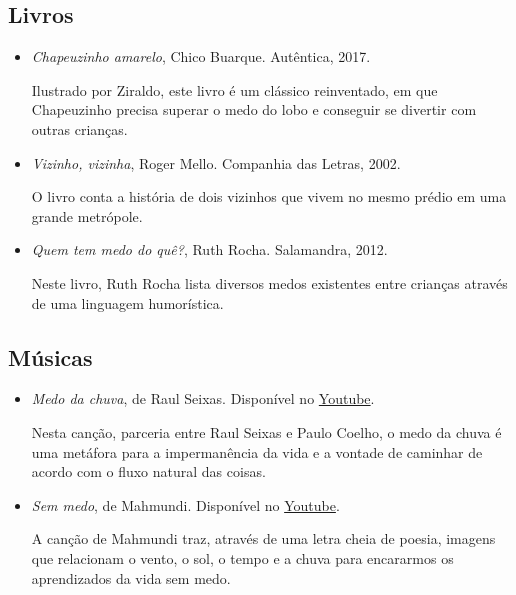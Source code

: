 \documentclass[11pt]{extarticle}
\begin{document}
\subsection{Livros}

\begin{itemize}

\item \textit{Chapeuzinho amarelo}, Chico Buarque. Autêntica, 2017.

Ilustrado por Ziraldo, este livro é um clássico reinventado, em que Chapeuzinho precisa superar o medo do lobo e conseguir se divertir com outras crianças.

\item \textit{Vizinho, vizinha}, Roger Mello. Companhia das Letras, 2002.

O livro conta a história de dois vizinhos que vivem no mesmo prédio em uma grande metrópole.

\item \textit{Quem tem medo do quê?}, Ruth Rocha. Salamandra, 2012.

Neste livro, Ruth Rocha lista diversos medos existentes entre crianças através de uma linguagem humorística.

\end{itemize}

\subsection{Músicas}

\begin{itemize}

\item \textit{Medo da chuva}, de Raul Seixas. Disponível no \href{https://www.youtube.com/watch?v=SQAozIai-IA&ab_channel=marciofernandes}{Youtube}. 

Nesta canção, parceria entre Raul Seixas e Paulo Coelho, o medo da chuva é uma metáfora para a impermanência da vida e a vontade de caminhar de acordo com o fluxo natural das coisas.

\item \textit{Sem medo}, de Mahmundi. Disponível no \href{https://www.youtube.com/watch?v=poHe_QYAZ4U&ab_channel=MahmundiVEVO}{Youtube}. 

A canção de Mahmundi traz, através de uma letra cheia de poesia, imagens que relacionam o vento, o sol, o tempo e a chuva para encararmos os aprendizados da vida sem medo.

\end{itemize}
\end{document}
